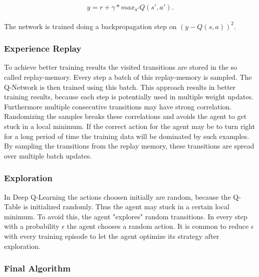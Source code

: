 \begin{equation*}
y = r + \gamma * max_{a'}Q(s', a').
\end{equation*}
\\
The network is trained doing a backpropagation step on $(y - Q(s, a))^2$.

\subsubsection{Experience Replay}

To achieve better training results the visited transitions are stored in the so called replay-memory. Every step a batch of this replay-memory is sampled. The Q-Network is then trained using this batch. This approach results in better training results, because each step is potentially used in multiple weight updates. Furthermore multiple consecutive transitions may have strong correlation. Randomizing the samples breaks these correlations and avoids the agent to get stuck in a local minimum. If the correct action for the agent may be to turn right for a long period of time the training data will be dominated by such examples. By sampling the transitions from the replay memory, these transitions are spread over multiple batch updates.  

\subsubsection{Exploration}

In Deep Q-Learning the actions choosen initially are random, because the Q-Table is initialized randomly. Thus the agent may stuck in a certain local minimum. To avoid this, the agent "explores" random transitions. In every step with a probability $\epsilon$ the agent chooses a random action. It is common to reduce $\epsilon$ with every training episode to let the agent optimize its strategy after exploration. 

\subsubsection{Final Algorithm}

